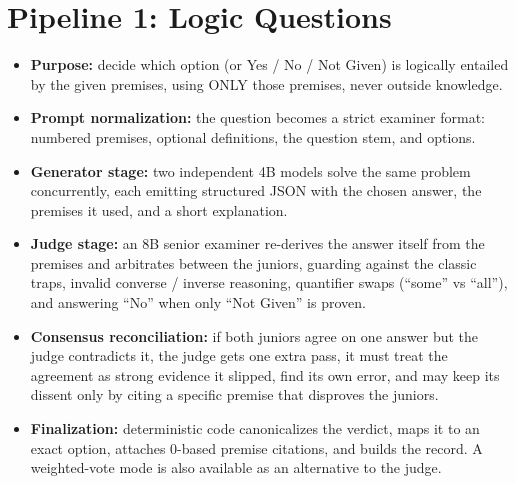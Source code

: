\documentclass[10pt]{article}
\begin{document}
\section*{Pipeline 1: Logic Questions}
\begin{itemize}
\item \textbf{Purpose:} decide which option (or Yes / No / Not Given) is
logically entailed by the given premises, using ONLY those premises, never
outside knowledge.
\item \textbf{Prompt normalization:} the question becomes a strict examiner
format: numbered premises, optional definitions, the question stem, and options.
\item \textbf{Generator stage:} two independent 4B models solve the same problem
concurrently, each emitting structured JSON with the chosen answer, the premises
it used, and a short explanation.
\item \textbf{Judge stage:} an 8B senior examiner re-derives the answer itself
from the premises and arbitrates between the juniors, guarding against the
classic traps, invalid converse / inverse reasoning, quantifier swaps
(``some'' vs ``all''), and answering ``No'' when only ``Not Given'' is proven.
\item \textbf{Consensus reconciliation:} if both juniors agree on one answer but
the judge contradicts it, the judge gets one extra pass, it must treat the
agreement as strong evidence it slipped, find its own error, and may keep its
dissent only by citing a specific premise that disproves the juniors.
\item \textbf{Finalization:} deterministic code canonicalizes the verdict, maps
it to an exact option, attaches 0-based premise citations, and builds the record.
A weighted-vote mode is also available as an alternative to the judge.
\end{itemize}
\end{document}
